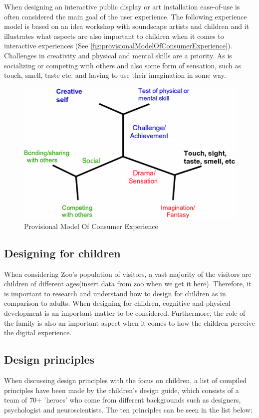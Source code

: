 When designing an interactive public display or art installation ease-of-use is often considered the main goal of the user experience\cite{Hull2018}. The following experience model is based on an idea workshop with soundscape artists and children and it illustrates what aspects are also important to children when it comes to interactive experiences (See \autoref{fig:provisionalModelOfConsumerExperience}). Challenges in creativity and physical and mental skills are a priority. As is socializing or competing with others and also some form of sensation, such as touch, smell, taste etc. and having to use their imagination in some way.
\begin{figure}[H]
    	\centering
    	\includegraphics[width=0.9\linewidth]{figure/Analysis/provModelExp.png}
    	\caption{Provisional Model Of Consumer Experience\cite{Hull2018}}
    	\label{fig:provisionalModelOfConsumerExperience}
\end{figure}

\subsection{Designing for children}
When considering Zoo's population of visitors, a vast majority of the visitors are children of different ages(insert data from zoo when we get it here). Therefore, it is important to research and understand how to design for children as in comparison to adults. 
When designing for children, cognitive and physical development is an important matter to be considered\cite{kidsDesign}. Furthermore, the role of the family is also an important aspect when it comes to how the children perceive the digital experience\cite{kidsDesign}.

\subsection{Design principles}
When discussing design principles with the focus on children, a list of compiled principles have been made by the children's design guide\cite{kidsDesign}, which consists of a team of 70+ 'heroes' who come from different backgrounds such as designers, psychologist and neuroscientists. The ten principles can be seen in the list below:

